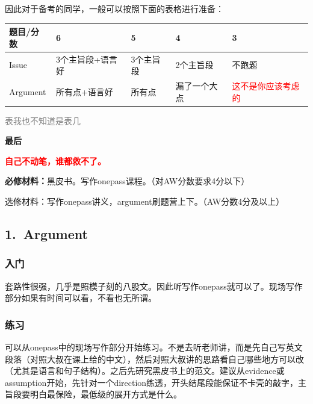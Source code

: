 \documentclass[11pt,a4paper]{article}
\begin{document}
{{		因此对于备考的同学，一般可以按照下面的表格进行准备：\newpage
		{\small
		\begin{center}
		\begin{tabular}{|l|l|l|l|l|}	
			\hline
			题目/分数 & 6 & 5 & 4 & 3 \\
			\hline			
			Issue & 3个主旨段+语言好 & 3个主旨段 & 2个主旨段 & 不跑题 \\  \hline
			Argument & 所有点+语言好 & 所有点 & 漏了一个大点 & 
			\textcolor{red}{这不是你应该考虑的}
			\\ \hline
		\end{tabular}
	
		\vspace{9pt}
		\textcolor{gray}{\footnotesize{表我也不知道是表几}}
		\end{center}
		}
		\vspace{11pt}
		{\bfseries{最后}}
		\vspace{22pt}
		\begin{center}
			{\bfseries\Huge
				\textcolor{red}{自己不动笔，谁都救不了。}}
		\end{center}
		
		\vspace{22pt}
		{\bfseries{必修材料：}}黑皮书。写作onepass课程。（对AW分数要求4分以下）
		
		选修材料：写作onepass讲义，argument刷题营上下。（AW分数4分及以上）
		
		\newpage
		\subsection*{1.~Argument}{
			\subsubsection*{入门}
				套路性很强，几乎是照模子刻的八股文。因此听写作onepass就可以了。现场写作部分如果有时间可以看，不看也无所谓。
			
			\subsubsection*{练习}
				可以从onepass中的现场写作部分开始练习。不是去听老师讲，而是先自己写英文段落（对照大叔在课上给的中文），然后对照大叔讲的思路看自己哪些地方可以改（尤其是语言和句子结构）。之后先研究黑皮书上的范文。建议从evidence或assumption开始，先针对一个direction练透，开头结尾段能保证不卡壳的敲字，主旨段要明白最保险，最低级的展开方式是什么。
}}}
\end{document}
